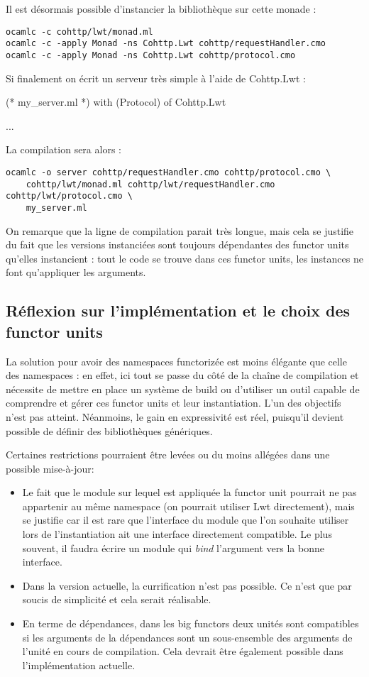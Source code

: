 \documentclass[11pt,a4paper]{report}
\begin{document}
Il est désormais possible d'instancier la bibliothèque sur cette monade :

\begin{verbatim}
ocamlc -c cohttp/lwt/monad.ml
ocamlc -c -apply Monad -ns Cohttp.Lwt cohttp/requestHandler.cmo
ocamlc -c -apply Monad -ns Cohttp.Lwt cohttp/protocol.cmo
\end{verbatim}

Si finalement on écrit un serveur très simple à l'aide de Cohttp.Lwt :
\begin{OCaml}
(* my_server.ml *)
with (Protocol) of Cohttp.Lwt

...
\end{OCaml}

La compilation sera alors :

\begin{verbatim}
ocamlc -o server cohttp/requestHandler.cmo cohttp/protocol.cmo \
    cohttp/lwt/monad.ml cohttp/lwt/requestHandler.cmo cohttp/lwt/protocol.cmo \
    my_server.ml 
\end{verbatim}

On remarque que la ligne de compilation parait très longue, mais cela se
justifie du fait que les versions instanciées sont toujours dépendantes des
functor units qu'elles instancient : tout le code se trouve dans ces functor
units, les instances ne font qu'appliquer les arguments.

\subsection{Réflexion sur l'implémentation et le choix des functor units}

La solution pour avoir des namespaces functorizée est moins élégante que celle
des namespaces : en effet, ici tout se passe du côté de la chaîne de compilation
et nécessite de mettre en place un système de build ou d'utiliser un outil
capable de comprendre et gérer ces functor units et leur instantiation. L'un des
objectifs n'est pas atteint. Néanmoins, le gain en expressivité est réel,
puisqu'il devient possible de définir des bibliothèques génériques.

Certaines restrictions pourraient être levées ou du moins allégées dans une
possible mise-à-jour:
\begin{itemize}
\item Le fait que le module sur lequel est appliquée la functor unit pourrait ne
  pas appartenir au même namespace (on pourrait utiliser Lwt directement), mais
  se justifie car il est rare que l'interface du module que l'on souhaite
  utiliser lors de l'instantiation ait une interface directement compatible. Le
  plus souvent, il faudra écrire un module qui \emph{bind} l'argument vers la
  bonne interface.
\item Dans la version actuelle, la currification n'est pas possible. Ce n'est
  que par soucis de simplicité et cela serait réalisable.
\item En terme de dépendances, dans les big functors deux unités sont
  compatibles si les arguments de la dépendances sont un sous-ensemble des
  arguments de l'unité en cours de compilation. Cela devrait être également
  possible dans l'implémentation actuelle.
\end{itemize}
\end{document}
